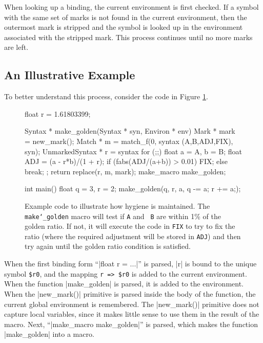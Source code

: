 When looking up a binding, the current environment is first checked.  If
a symbol with the same set of marks is not found in the current
environment, then the outermost mark is stripped and the symbol is
looked up in the environment associated with the stripped mark.  This
process continues until no more marks are left.


\subsection{An Illustrative Example}

To better understand this process, consider the code in Figure
\ref{hygiene-fig}.  
\begin{figure}
\begin{codef}
float r = 1.61803399;

Syntax * make_golden(Syntax * syn, Environ * env) { 
  Mark * mark = new_mark(); 
  Match * m = match_f(0, syntax (A,B,ADJ,FIX), syn); 
  UnmarkedSyntax * r = syntax { 
    for (;;) { float a = A, b = B; 
               float ADJ = (a - r*b)/(1 + r); 
               if (fabs(ADJ/(a+b)) > 0.01) FIX; 
               else break; } 
  }; 
  return replace(r, m, mark); 
} 
make_macro make_golden; 

int main() {
  float q = 3, r = 2;
  make_golden(q, r, a, {q -= a; r += a;});
}
\end{codef}
\caption[Example code to illustrate how hygiene is maintained.]%
{Example code to illustrate how hygiene is maintained.
  The {\tt make\char`\_golden} macro will test if {\tt A} and {\tt
    B} are within 1\% of the golden ratio.  If not, it will execute
  the code in {\tt FIX} to try to fix the ratio (where the required
  adjustment will be stored in {\tt ADJ}) and then try again until the 
  golden ratio condition is satisfied.}
\label{hygiene-fig}
\end{figure}
When the first binding form ``|float r = ...|'' is
parsed, |r| is bound to the unique symbol \verb/$r0/, and the mapping
\verb/r => $r0/ is added to the current environment.  When the
function |make_golden| is parsed, it is added to the environment.
When the |new_mark()| primitive is parsed inside the body of the
function, the current global environment is remembered.  The
|new_mark()| primitive does not capture local variables, since it
makes little sense to use them in the result of the macro.  Next,
``|make_macro make_golden|'' is parsed, which makes the function
|make_golden| into a macro.

